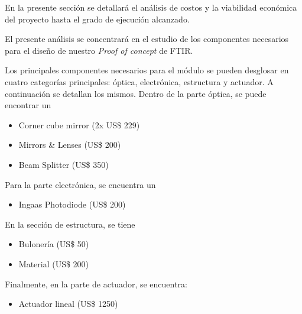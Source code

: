 \documentclass[11pt,titlepage]{article}
\begin{document}
En la presente sección se detallará el análisis de costos y la viabilidad económica del proyecto hasta el grado de ejecución alcanzado.\par

El presente análisis se concentrará en el estudio de los componentes necesarios para el diseño de nuestro \textit{Proof of concept} de FTIR.
\\\par
Los principales componentes necesarios para el módulo se pueden desglosar en cuatro categorías principales: óptica, electrónica, estructura y actuador. A continuación se detallan los mismos.
Dentro de la parte óptica, se puede encontrar un 
\begin{itemize}
    \item Corner cube mirror (2x US\$ 229)
    \item Mirrors \& Lenses (US\$ 200)
    \item Beam Splitter (US\$ 350)
\end{itemize}\par

Para la parte electrónica, se encuentra un
\begin{itemize}
    \item Ingaas Photodiode (US\$ 200)
\end{itemize}\par

En la sección de estructura, se tiene
\begin{itemize}
    \item Bulonería (US\$ 50)
    \item Material (US\$ 200)
\end{itemize}\par
Finalmente, en la parte de actuador, se encuentra:
\begin{itemize}
    \item Actuador lineal (US\$ 1250)
\end{itemize}
\end{document}
